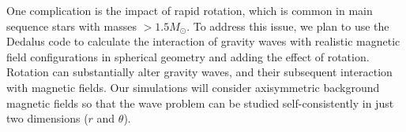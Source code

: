 One complication is the impact of rapid rotation, which is common in main sequence stars with masses $> 1.5M_\odot$. To address this issue,
we plan to use the Dedalus code to calculate the interaction of gravity waves with realistic magnetic field configurations in spherical geometry \citep[e.g.][]{Braithwaite_2006} 
and adding the effect of rotation. Rotation can substantially alter gravity waves, and their subsequent interaction with magnetic fields. Our simulations will consider axisymmetric background magnetic fields so that the wave problem can be studied self-consistently in just two dimensions ($r$ and $\theta$). 